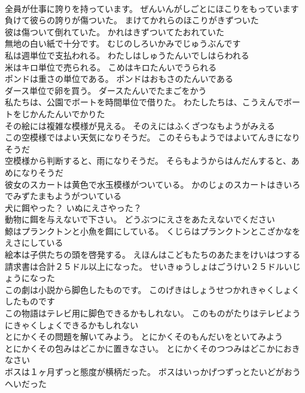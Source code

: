 \documentclass[8pt]{extreport}
\begin{document}
\begin{CJK}{UTF8}{min}
\\	全員が仕事に誇りを持っています。	ぜんいんがしごとにほこりをもっています 
\\	負けて彼らの誇りが傷ついた。	まけてかれらのほこりがきずついた 
\\	彼は傷ついて倒れていた。	かれはきずついてたおれていた 
\\	無地の白い紙で十分です。	むじのしろいかみでじゅうぶんです 
\\	私は週単位で支払われる。	わたしはしゅうたんいでしはらわれる 
\\	米はキロ単位で売られる。	こめはキロたんいでうられる 
\\	ポンドは重さの単位である。	ポンドはおもさのたんいである 
\\	ダース単位で卵を買う。	ダースたんいでたまごをかう 
\\	私たちは、公園でボートを時間単位で借りた。	わたしたちは、こうえんでボートをじかんたんいでかりた 
\\	その絵には複雑な模様が見える。	そのえにはふくざつなもようがみえる 
\\	この空模様ではよい天気になりそうだ。	このそらもようではよいてんきになりそうだ 
\\	空模様から判断すると、雨になりそうだ。	そらもようからはんだんすると、あめになりそうだ 
\\	彼女のスカートは黄色で水玉模様がついている。	かのじょのスカートはきいろでみずたまもようがついている 
\\	犬に餌やった？	いぬにえさやった？ 
\\	動物に餌を与えないで下さい。	どうぶつにえさをあたえないでください 
\\	鯨はプランクトンと小魚を餌にしている。	くじらはプランクトンとこざかなをえさにしている 
\\	絵本は子供たちの頭を啓発する。	えほんはこどもたちのあたまをけいはつする 
\\	請求書は合計２５ドル以上になった。	せいきゅうしょはごうけい２５ドルいじょうになった 
\\	この劇は小説から脚色したものです。	このげきはしょうせつかれきゃくしょくしたものです 
\\	この物語はテレビ用に脚色できるかもしれない。	このものがたりはテレビようにきゃくしょくできるかもしれない 
\\	とにかくその問題を解いてみよう。	とにかくそのもんだいをといてみよう 
\\	とにかくその包みはどこかに置きなさい。	とにかくそのつつみはどこかにおきなさい 
\\	ボスは１ヶ月ずっと態度が横柄だった。	ボスはいっかげつずっとたいどがおうへいだった 

\end{CJK}
\end{document}
